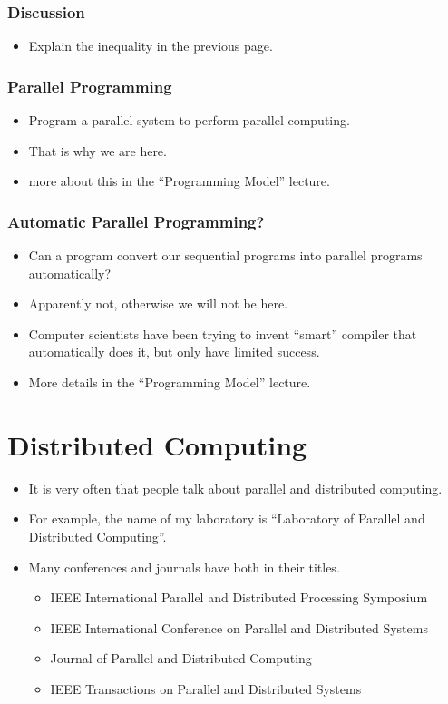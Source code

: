 \documentclass{beamer}
\begin{document}
\begin{CJK}{UTF8}{bsmi}
\begin{frame}
\frametitle{Discussion} 
\begin{itemize}
\item Explain the inequality in the previous page.
\end{itemize}
\end{frame}

\begin{frame}
\frametitle{Parallel Programming} 
\begin{itemize}
\item Program a parallel system to perform parallel computing.
\item That is why we are here.
\item more about this in the ``Programming Model'' lecture.
\end{itemize}
\end{frame}

\begin{frame}
\frametitle{Automatic Parallel Programming?} 
\begin{itemize}
\item Can a program convert our sequential programs into parallel
  programs automatically?
\item Apparently not, otherwise we will not be here.
\item Computer scientists have been trying to invent ``smart''
  compiler that automatically does it, but only have limited success.
\item More details in the ``Programming Model'' lecture.
\end{itemize}
\end{frame}

\section{Distributed Computing}

\begin{frame}
\begin{itemize}
\item It is very often that people talk about parallel and distributed
  computing.
\item For example, the name of my laboratory is ``Laboratory of
  Parallel and Distributed Computing''.
\item Many conferences and journals have both in their titles.
\begin{itemize}
\item IEEE International Parallel and Distributed Processing Symposium
\item IEEE International Conference on Parallel and Distributed Systems
\item Journal of Parallel and Distributed Computing
\item IEEE Transactions on Parallel and Distributed Systems
\end{itemize}
\end{itemize}
\end{frame}


\end{CJK}
\end{document}
